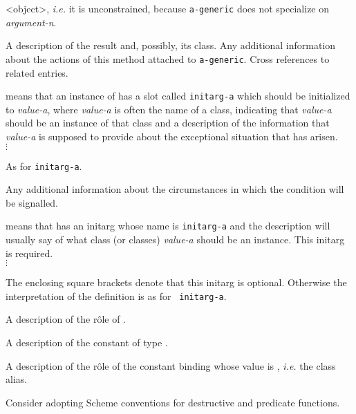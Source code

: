 \begin{optDefinition}
\begin{specargs}
{        <object>}, {\em i.e.} it is unconstrained, because {\tt a-generic} does
    not specialize on {\em argument-n}.
\end{specargs}
%
\result%
A description of the result and, possibly, its class.
%
\remarks%
Any additional information about the actions of this method attached
to {\tt a-generic}.
%
\seealso%
Cross references to related entries.
%
%
\begin{initoptions}
    \item[initarg-a, value-a] means that an instance of {\tt <a-condition>} has
    a slot called {\tt initarg-a} which should be initialized to {\em value-a},
    where {\em value-a} is often the name of a class, indicating that {\em
        value-a} should be an instance of that class and a description of the
    information that {\em value-a} is
    supposed to provide about the exceptional situation that has arisen.\\
    $\vdots$
    \item[initarg-n, value-n] As for {\tt initarg-a}.
\end{initoptions}
%
\remarks%
Any additional information about the circumstances in which the
condition will be signalled.
%
%
\begin{initoptions}
    \item[initarg-a, value-a] means that {\tt <a-class>} has an
    initarg whose name is {\tt initarg-a} and the description will usually
    say of what class (or classes) {\em value-a} should be an instance.
    This initarg is required.\\ $\vdots$
    \item[{\tt[}initarg-n, value-n{\tt]}]
    The enclosing square brackets denote that this initarg is optional.
    Otherwise the interpretation of the definition is as for {\tt
        initarg-a}.
\end{initoptions}
%
\remarks%
A description of the r\^ole of {\tt <a-class>}.

%
\remarks%
A description of the constant of type .

%
\remarks%
A description of the r\^ole of the constant binding whose value is
, {\em i.e.} the class alias.

\end{optDefinition}
%
%
\begin{optPrivate}
    Consider adopting Scheme conventions for destructive and predicate
    functions.
\end{optPrivate}
